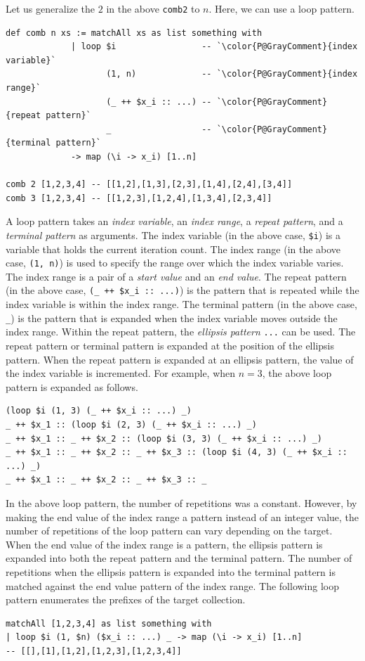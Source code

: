 Let us generalize the $2$ in the above \lstinline{comb2} to $n$.
Here, we can use a loop pattern.
\begin{lstlisting}[language=egison,numbers=none]
def comb n xs := matchAll xs as list something with
             | loop $i                 -- `\color{P@GrayComment}{index variable}`
                    (1, n)             -- `\color{P@GrayComment}{index range}`
                    (_ ++ $x_i :: ...) -- `\color{P@GrayComment}{repeat pattern}`
                    _                  -- `\color{P@GrayComment}{terminal pattern}`
             -> map (\i -> x_i) [1..n]

comb 2 [1,2,3,4] -- [[1,2],[1,3],[2,3],[1,4],[2,4],[3,4]]
comb 3 [1,2,3,4] -- [[1,2,3],[1,2,4],[1,3,4],[2,3,4]]
\end{lstlisting}
A loop pattern takes an \emph{index variable}, an \emph{index range}, a \emph{repeat pattern}, and a \emph{terminal pattern} as arguments.
The index variable (in the above case, \lstinline{$i}) is a variable that holds the current iteration count.
The index range (in the above case, \lstinline{(1, n)}) is used to specify the range over which the index variable varies.
The index range is a pair of a \emph{start value} and an \emph{end value}.
The repeat pattern (in the above case, \lstinline{(_ ++ $x_i :: ...)}) is the pattern that is repeated while the index variable is within the index range.
The terminal pattern (in the above case, \lstinline{_}) is the pattern that is expanded when the index variable moves outside the index range.
Within the repeat pattern, the \emph{ellipsis pattern} \lstinline{...} can be used.
The repeat pattern or terminal pattern is expanded at the position of the ellipsis pattern.
When the repeat pattern is expanded at an ellipsis pattern, the value of the index variable is incremented.
For example, when $n=3$, the above loop pattern is expanded as follows.
\begin{lstlisting}[language=egison]
(loop $i (1, 3) (_ ++ $x_i :: ...) _)
_ ++ $x_1 :: (loop $i (2, 3) (_ ++ $x_i :: ...) _)
_ ++ $x_1 :: _ ++ $x_2 :: (loop $i (3, 3) (_ ++ $x_i :: ...) _)
_ ++ $x_1 :: _ ++ $x_2 :: _ ++ $x_3 :: (loop $i (4, 3) (_ ++ $x_i :: ...) _)
_ ++ $x_1 :: _ ++ $x_2 :: _ ++ $x_3 :: _
\end{lstlisting}

In the above loop pattern, the number of repetitions was a constant.
However, by making the end value of the index range a pattern instead of an integer value, the number of repetitions of the loop pattern can vary depending on the target.
When the end value of the index range is a pattern, the ellipsis pattern is expanded into both the repeat pattern and the terminal pattern.
The number of repetitions when the ellipsis pattern is expanded into the terminal pattern is matched against the end value pattern of the index range.
The following loop pattern enumerates the prefixes of the target collection.
\begin{lstlisting}[language=egison,numbers=none]
matchAll [1,2,3,4] as list something with
| loop $i (1, $n) ($x_i :: ...) _ -> map (\i -> x_i) [1..n]
-- [[],[1],[1,2],[1,2,3],[1,2,3,4]]
\end{lstlisting}

